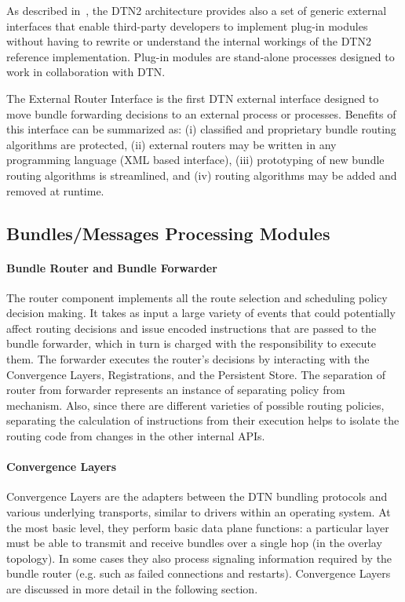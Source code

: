 As described in~\cite{Demmer03implementingdelay, DTN2Manual}, the DTN2 architecture provides also a set of generic external interfaces that enable third-party developers to implement plug-in modules without having to rewrite or understand the internal workings of the DTN2 reference implementation. Plug-in modules are stand-alone processes designed to work in collaboration with DTN.

The External Router Interface is the first DTN external interface designed to move bundle forwarding decisions to an external process or processes. Benefits of this interface can be summarized as: (i) classified and proprietary bundle routing algorithms are protected, (ii) external routers may be written in any programming language (XML based interface), (iii) prototyping of new bundle routing algorithms is streamlined, and (iv) routing algorithms may be added and removed at runtime.

\subsection{Bundles/Messages Processing Modules}

\paragraph{Bundle Router and Bundle Forwarder}
 
The router component implements all the route selection and scheduling policy decision making. It takes as input a large variety of events that could potentially affect routing decisions and issue encoded instructions that are passed to the bundle forwarder, which in turn is charged with the responsibility to execute them. The forwarder executes the router's decisions by interacting with the Convergence Layers, Registrations, and the Persistent Store. The separation of router from forwarder represents an instance of separating policy from mechanism. Also, since there are different varieties of possible routing policies, separating the calculation of instructions from their execution helps to isolate the routing code from changes in the other internal APIs.

\paragraph{Convergence Layers}
Convergence Layers are the adapters between the DTN bundling protocols and various underlying transports, similar to drivers within an operating system. At the most basic level, they perform basic data plane functions: a particular layer must be able to transmit and receive bundles over a single hop (in the overlay topology). In some cases they also process signaling information required by the bundle router (e.g. such as failed connections and restarts). Convergence Layers are discussed in more detail in the following section.

